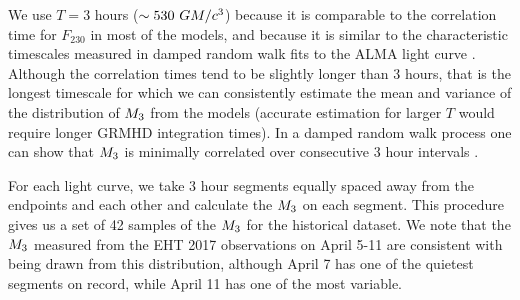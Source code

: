 We use $T = 3$ hours ($\sim 530~GM/c^3$) because it is comparable to the correlation time for $F_{230}$ in most of the models, and because it is similar to the characteristic timescales measured in damped random walk fits to the ALMA light curve \citep[see Table 10 of][]{Wielgus2022}.  Although the correlation times tend to be slightly longer than 3 hours, that is the longest timescale for which we can consistently estimate the mean and variance of the distribution of $M_{3}$ from the models (accurate estimation for larger $T$ would require longer GRMHD integration times).  In a damped random walk process one can show that $M_{3}$ is minimally correlated over consecutive 3 hour intervals \citep{Lee_2022}.

For each light curve, we take 3 hour segments equally spaced away from the endpoints and each other and calculate the $M_{3}$ on each segment. This procedure gives us a set of 42 samples of the $M_{3}$ for the historical dataset. We note that the $M_{3}$ measured from the EHT 2017 observations on April 5-11 are consistent with being drawn from this distribution, although April 7 has one of the quietest segments on record, while April 11 has one of the most variable.



